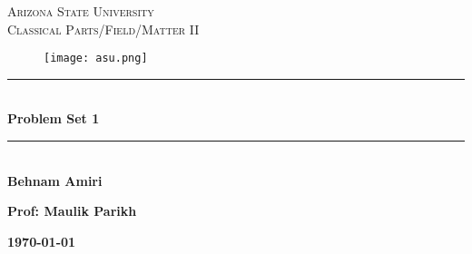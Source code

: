 \documentclass[fleqn]{article}
\begin{document}
  \begin{titlepage}

    \newcommand{\HRule}{\rule{\linewidth}{0.5mm}}

    \center


    \textsc{\LARGE Arizona State University}\\[1.5cm]

    \textsc{\LARGE Classical Parts/Field/Matter II}\\[1.5cm]


    \begin{figure}
      \texttt{[image: asu.png]}
    \end{figure}


    \HRule \\[0.4cm]
    { \huge \bfseries Problem Set 1}\\[0.4cm] 
    \HRule \\[1.5cm]

    \textbf{Behnam Amiri}

    \bigbreak

    \textbf{Prof: Maulik Parikh}

    \bigbreak


    \textbf{{\large \today}\\[2cm]}

    \vfill

  \end{titlepage}
\end{document}

